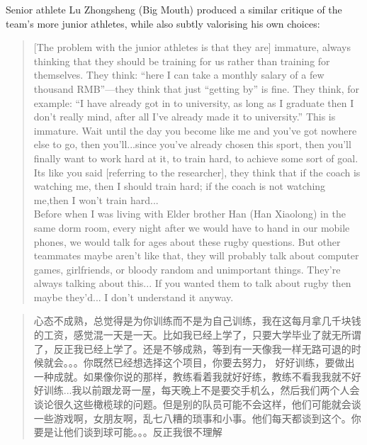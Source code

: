 \begin{CJK}{UTF8}{gbsn}
Senior athlete Lu Zhongsheng (Big Mouth) produced a similar critique of the team's more junior athletes, while also subtly valorising his own choices:

  \begin{quote}
    [The problem with the junior athletes is that they are] immature, always thinking that they should be training for us rather than training for themselves.  They think: ``here I can take a monthly salary of a few thousand RMB''---they think that just ``getting by'' is fine.  They think, for example: ``I have already got in to university, as long as I graduate then I don't really mind, after all I've already made it to university.''  This is immature.  Wait until the day you become like me and you've got nowhere else to go, then you'll...since you've already chosen this sport, then you'll finally want to work hard at it, to train hard, to achieve some sort of goal.  Its like you said [referring to the researcher], they think that if the coach is watching me, then I should train hard; if the coach is not watching me,then I won't train hard...\\

    Before when I was living with Elder brother Han (Han Xiaolong) in the same dorm room, every night after we would have to hand in our mobile phones, we would talk for ages about these rugby questions. But other teammates maybe aren't like that, they will probably talk about computer games, girlfriends, or bloody random and unimportant things.  They're always talking about this... If you wanted them to talk about rugby then maybe they'd... I don't understand it anyway.
  \end{quote}

  \begin{quote}
    心态不成熟，总觉得是为你训练而不是为自己训练，我在这每月拿几千块钱的工资，感觉混一天是一天。比如我已经上学了，只要大学毕业了就无所谓了，反正我已经上学了。还是不够成熟，等到有一天像我一样无路可退的时候就会。。。你既然已经想选择这个项目，你要去努力， 好好训练，要做出一种成就。如果像你说的那样，教练看着我就好好练，教练不看我我就不好好训练...我以前跟龙哥一屋，每天晚上不是要交手机么，然后我们两个人会谈论很久这些橄榄球的问题。但是别的队员可能不会这样，他们可能就会谈一些游戏啊，女朋友啊，乱七八糟的琐事和小事。他们每天都谈到这个。你要是让他们谈到球可能。。。反正我很不理解
  \end{quote}


\end{CJK}

